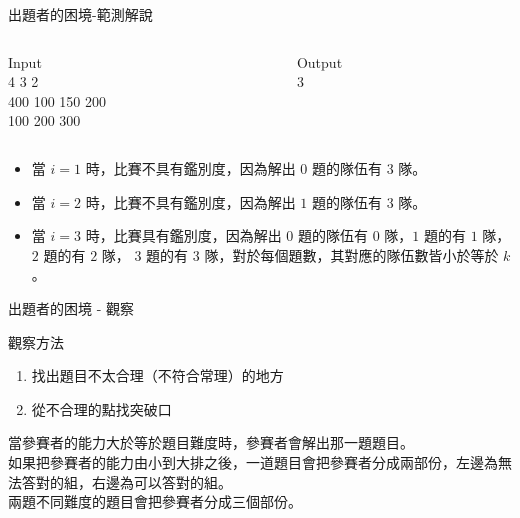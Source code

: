\documentclass[xcolor=table]{beamer}
\begin{document}
\begin{frame}{出題者的困境-範測解說}
    \begin{columns}
        \begin{column}{0.45\textwidth}
            Input\\[1mm]
            4 3 2\\
            400 100 150 200\\
            100 200 300
        \end{column}
        \begin{column}{0.45\textwidth}
            Output\\[1mm]
            3  \vspace{25pt}
        \end{column}
    \end{columns}
    \vspace{10pt}
    \begin{itemize}
        \item 當 $i = 1$ 時，比賽不具有鑑別度，因為解出 $0$ 題的隊伍有 $3$ 隊。
        \item 當 $i = 2$ 時，比賽不具有鑑別度，因為解出 $1$ 題的隊伍有 $3$ 隊。
        \item 當 $i = 3$ 時，比賽具有鑑別度，因為解出 $0$ 題的隊伍有 $0$ 隊，$1$ 題的有 $1$ 隊，$2$ 題的有 $2$ 隊， $3$ 題的有 $3$ 隊，對於每個題數，其對應的隊伍數皆小於等於 $k$。
    \end{itemize}
\end{frame}

\begin{frame}{出題者的困境 - 觀察}
    \begin{block}{觀察方法}
        \begin{enumerate}
            \item 找出題目不太合理（不符合常理）的地方
            \item 從不合理的點找突破口
        \end{enumerate}
    \end{block}
    \pause
    當參賽者的能力大於等於題目難度時，參賽者會解出那一題題目。\\[3mm]
    
    \pause
    如果把參賽者的能力由小到大排之後，一道題目會把參賽者分成兩部份，左邊為無法答對的組，右邊為可以答對的組。\\[3mm]
    \pause
    兩題不同難度的題目會把參賽者分成三個部份。

\end{frame}
\end{document}
